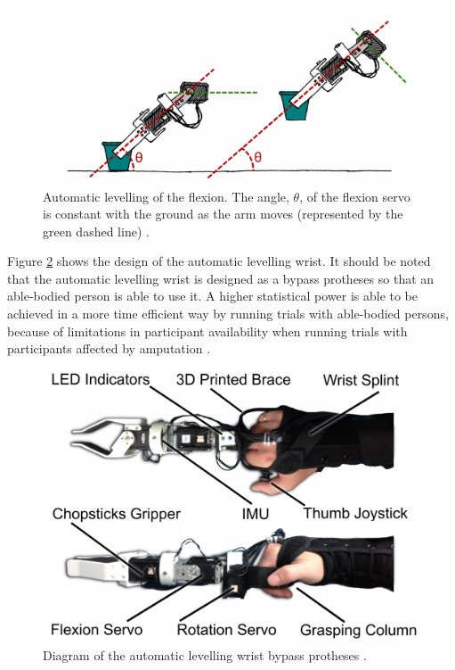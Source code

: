 \documentclass[letterpaper,12pt]{article}
\begin{document}
\begin{figure}[H]
\centering \includegraphics[width=0.8\columnwidth]{auto_levelling.png}
\caption{\label{fig:auto_levelling}Automatic levelling of the flexion. The angle, $\theta$, of the flexion servo is constant with the ground as the arm moves (represented by the green dashed line) \cite{d.j.a.brenneis}.}
\end{figure}

Figure \ref{fig:slw_diagram} shows the design of the automatic levelling wrist. It should be noted that the automatic levelling wrist is designed as a bypass protheses so that an able-bodied person is able to use it. A higher statistical power is able to be achieved in a more time efficient way by running trials with able-bodied persons, because of limitations in participant availability when running trials with participants affected by amputation \cite{d.j.a.brenneis}.

\begin{figure}[H]
\centering \includegraphics[width=0.8\columnwidth]{slw_diagram.png}
\caption{\label{fig:slw_diagram}Diagram of the automatic levelling wrist bypass protheses \cite{d.j.a.brenneis}.}
\end{figure}
\end{document}
